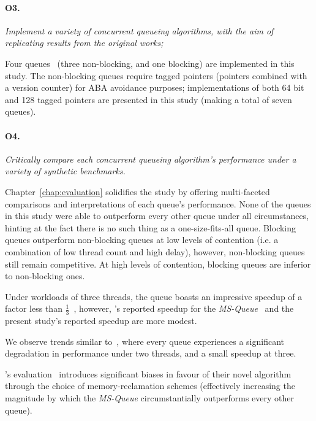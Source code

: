 \paragraph{O3.} \emph{Implement a variety of concurrent queueing algorithms, with the aim
of replicating results from the original works;}

Four queues~\citep{valois1994queues,hoffman2007baskets,michael1996simple} (three non-blocking, and one blocking) are implemented in this
study. The non-blocking queues require tagged pointers (pointers combined with a
version counter) for ABA avoidance purposes; implementations of both 64 bit and
128 tagged pointers are presented in this study (making a total of seven
queues).

\paragraph{O4.} \emph{Critically compare each concurrent queueing algorithm's performance
under a variety of synthetic benchmarks.}

Chapter~\ref{chap:evaluation} solidifies the study by offering multi-faceted
comparisons and interpretations of each queue's performance. None of the queues
in this study were able to outperform every other queue under all
circumstances, hinting at the fact there is no such thing as a
one-size-fits-all queue. Blocking queues outperform non-blocking queues at low
levels of contention (i.e. a combination of low thread count and high delay),
however, non-blocking queues still remain competitive. At high levels of
contention, blocking queues are inferior to non-blocking ones. 

Under workloads of three threads, the \citeauthor{michael1996simple} queue boasts an
impressive speedup of a factor less than $\frac{1}{3}$~\citep{michael1996simple},
however, \citeauthor{hoffman2007baskets}'s reported speedup for the
\emph{MS-Queue}~\citep{hoffman2007baskets} and the present study's reported
speedup are more modest.

We observe trends similar
to~\citep{ladan2008optimistic,hoffman2007baskets,michael1996simple}, where
every queue experiences a significant degradation in performance under two
threads, and a small speedup at three.

\citeauthor{michael1996simple}'s evaluation~\citep{michael1996simple}
introduces significant biases in favour of their novel algorithm through the
choice of memory-reclamation schemes (effectively increasing the magnitude by
which the \emph{MS-Queue} circumstantially outperforms every other queue).

